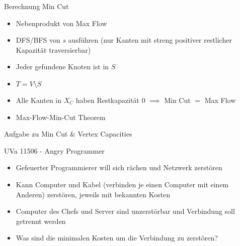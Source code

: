 
\begin{frame}{Berechnung Min Cut}
    \begin{itemize}
        \item Nebenprodukt von Max Flow
        \pause\item DFS/BFS von $s$ ausführen (nur Kanten mit streng positiver restlicher Kapazität
        traversierbar)
        \pause\item Jeder gefundene Knoten ist in $S$
        \pause\item \(T = V\setminus S\)
        \pause\item Alle Kanten in $X_C$ haben Restkapazität $0$ \(\implies\) Min
        Cut $=$ Max Flow
        \pause\item Max-Flow-Min-Cut Theorem
    \end{itemize}
\end{frame}

\begin{frame}{Aufgabe zu Min Cut \& Vertex Capacities}
    \begin{block}{UVa 11506 - Angry Programmer}
        \begin{itemize}
            \item Gefeuerter Programmierer will sich rächen und Netzwerk zerstören
            \pause\item Kann Computer und Kabel (verbinden je einen Computer mit einem
            Anderen) zerstören, jeweils mit bekannten Kosten
            \pause\item Computer des Chefs und Server sind unzerstörbar und Verbindung
soll getrennt werden
            \pause\item Was sind die minimalen Kosten um die Verbindung zu zerstören?
        \end{itemize}
    \end{block}
\end{frame}

